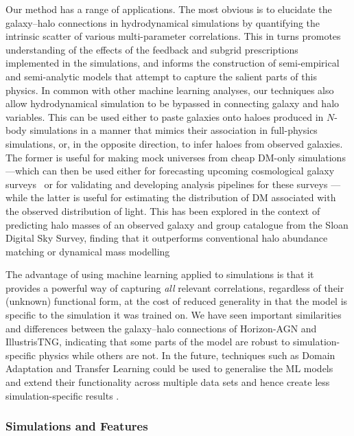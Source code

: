 \documentclass[usenatbib,useAMS]{mnras}
\begin{document}
Our method has a range of applications. The most obvious is to elucidate the galaxy--halo connections in hydrodynamical simulations by quantifying the intrinsic scatter of various multi-parameter correlations. This in turns promotes understanding of the effects of the feedback and subgrid prescriptions implemented in the simulations, and informs the construction of semi-empirical and semi-analytic models that attempt to capture the salient parts of this physics. In common with other machine learning analyses, our techniques also allow hydrodynamical simulation to be bypassed in connecting galaxy and halo variables. This can be used either to paste galaxies onto haloes produced in $N$-body simulations in a manner that mimics their association in full-physics simulations, or, in the opposite direction, to infer haloes from observed galaxies. The former is useful for making mock universes from cheap \ac{DM}-only simulations---which can then be used either for forecasting upcoming cosmological galaxy surveys~\citep[e.g.][]{Reddick_2014, Zhang_2019, Kasmanoff_2020, Wechsler2021Addgals} or for validating and developing analysis pipelines for these surveys \citep[e.g.][]{DeRose2019Buzzard}---while the latter is useful for estimating the distribution of \ac{DM} associated with the observed distribution of light. This has been explored in the context of predicting halo masses of an observed galaxy and group catalogue from the Sloan Digital Sky Survey, finding that it outperforms conventional halo abundance matching or dynamical mass modelling~\citep{Calderon_2019}


The advantage of using machine learning applied to simulations is that it provides a powerful way of capturing \emph{all} relevant correlations, regardless of their (unknown) functional form, at the cost of reduced generality in that the model is specific to the simulation it was trained on. We have seen important similarities and differences between the galaxy--halo connections of Horizon-AGN and IllustrisTNG, indicating that some parts of the model are robust to simulation-specific physics while others are not. In the future, techniques such as Domain Adaptation and Transfer Learning could be used to generalise the ML models and extend their functionality across multiple data sets and hence create less simulation-specific results \citep[e.g.][]{Ciprijanovic2021DomAdap}.


\subsubsection{Simulations and Features}
\end{document}
